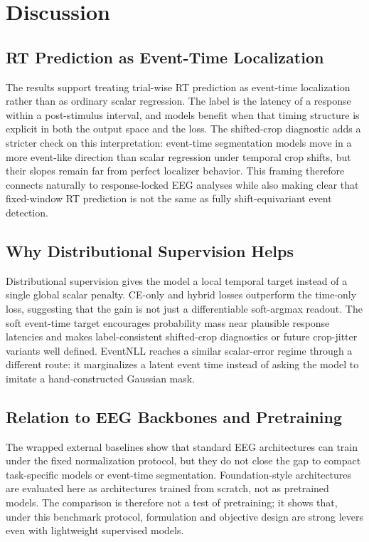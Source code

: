 \documentclass[12pt]{article}
\begin{document}
\section{Discussion}

\subsection{RT Prediction as Event-Time Localization}

The results support treating trial-wise RT prediction as event-time localization rather than as ordinary scalar regression. The label is the latency of a response within a post-stimulus interval, and models benefit when that timing structure is explicit in both the output space and the loss. The shifted-crop diagnostic adds a stricter check on this interpretation: event-time segmentation models move in a more event-like direction than scalar regression under temporal crop shifts, but their slopes remain far from perfect localizer behavior. This framing therefore connects naturally to response-locked EEG analyses while also making clear that fixed-window RT prediction is not the same as fully shift-equivariant event detection.

\subsection{Why Distributional Supervision Helps}

Distributional supervision gives the model a local temporal target instead of a single global scalar penalty. CE-only and hybrid losses outperform the time-only loss, suggesting that the gain is not just a differentiable soft-argmax readout. The soft event-time target encourages probability mass near plausible response latencies and makes label-consistent shifted-crop diagnostics or future crop-jitter variants well defined. EventNLL reaches a similar scalar-error regime through a different route: it marginalizes a latent event time instead of asking the model to imitate a hand-constructed Gaussian mask.

\subsection{Relation to EEG Backbones and Pretraining}

The wrapped external baselines show that standard EEG architectures can train under the fixed normalization protocol, but they do not close the gap to compact task-specific models or event-time segmentation. Foundation-style architectures are evaluated here as architectures trained from scratch, not as pretrained models. The comparison is therefore not a test of pretraining; it shows that, under this benchmark protocol, formulation and objective design are strong levers even with lightweight supervised models.
\end{document}
